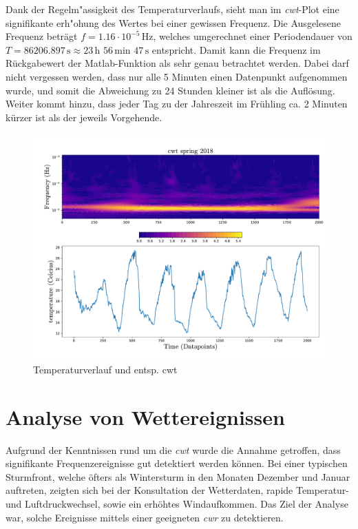 \begin{refsection}
Dank der Regelm"assigkeit des Temperaturverlaufs, sieht man im \textit{cwt}-Plot eine signifikante erh"ohung des Wertes bei einer gewissen Frequenz.
Die Ausgelesene Frequenz beträgt $f = 1.16\cdot10^{-5} \,\text{Hz}$, welches umgerechnet einer Periodendauer von $T = 86206.897\,\text{s}\approx 23\,\text{h }56\,\text{min } 47\,\text{s}$ entspricht.
Damit kann die Frequenz im Rückgabewert der Matlab-Funktion als sehr genau betrachtet werden.
Dabei darf nicht vergessen werden, dass nur alle 5 Minuten einen Datenpunkt aufgenommen wurde, und somit die Abweichung zu 24 Stunden kleiner ist als die Auflösung.
Weiter kommt hinzu, dass jeder Tag zu der Jahreszeit im Frühling ca. 2 Minuten kürzer ist als der jeweils Vorgehende\cite{online:sunset_time}.

\begin{figure}[h]
	\centering
	\includegraphics[width=1\textwidth]{papers/wwt/images/data_spring.pdf}
	\caption{Temperaturverlauf und entsp. cwt}
	\label{fig:cwt_zoom}
\end{figure}




\section{Analyse von Wettereignissen}
Aufgrund der Kenntnissen rund um die \textit{cwt} wurde die Annahme getroffen, dass signifikante Frequenzereignisse gut detektiert werden können.
Bei einer typischen Sturmfront, welche öfters als Wintersturm in den Monaten Dezember und Januar auftreten, zeigten sich bei der Konsultation der Wetterdaten, rapide Temperatur- und Luftdruckwechsel, sowie ein erhöhtes Windaufkommen.
Das Ziel der Analyse war, solche Ereignisse mittels einer geeigneten \textit{cwr} zu detektieren.

\end{refsection}
